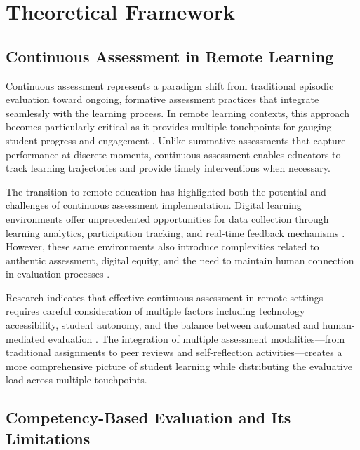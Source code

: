 
\section{Theoretical Framework}

\subsection{Continuous Assessment in Remote Learning}

Continuous assessment represents a paradigm shift from traditional episodic evaluation toward ongoing, formative assessment practices that integrate seamlessly with the learning process. In remote learning contexts, this approach becomes particularly critical as it provides multiple touchpoints for gauging student progress and engagement \cite{Kumar2024}. Unlike summative assessments that capture performance at discrete moments, continuous assessment enables educators to track learning trajectories and provide timely interventions when necessary.

The transition to remote education has highlighted both the potential and challenges of continuous assessment implementation. Digital learning environments offer unprecedented opportunities for data collection through learning analytics, participation tracking, and real-time feedback mechanisms \cite{Anderson2022}. However, these same environments also introduce complexities related to authentic assessment, digital equity, and the need to maintain human connection in evaluation processes \cite{Martinez2022}.

Research indicates that effective continuous assessment in remote settings requires careful consideration of multiple factors including technology accessibility, student autonomy, and the balance between automated and human-mediated evaluation \cite{Chen2024}. The integration of multiple assessment modalities—from traditional assignments to peer reviews and self-reflection activities—creates a more comprehensive picture of student learning while distributing the evaluative load across multiple touchpoints.

\subsection{Competency-Based Evaluation and Its Limitations}

